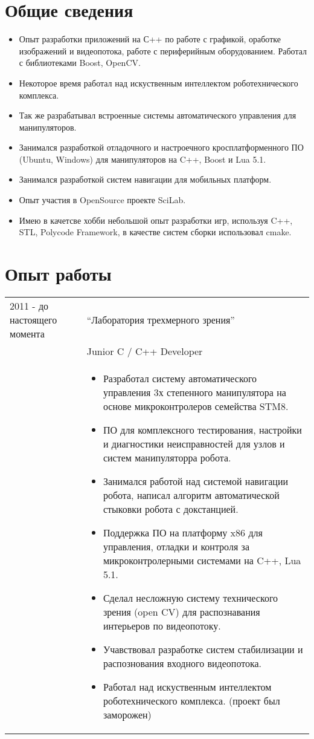 \documentclass[a4paper, 10pt]{article}
\begin{document}
\section{Общие сведения}
\begin{itemize}
    \item Опыт разработки приложений на С++ по работе с графикой, оработке
    изображений и видеопотока, работе с периферийным оборудованием. 
    Работал с библиотеками Boost, OpenCV. 
    \item Некоторое время работал над искуственным интеллектом роботехнического комплекса.
    \item Так же разрабатывал встроенные системы автоматического управления для
    манипуляторов. 
    \item Занимался разработкой отладочного и настроечного
    кросплатформенного ПО (Ubuntu, Windows) для манипуляторов на C++, Boost и Lua 5.1. 
    \item Занимался разработкой систем навигации для мобильных платформ.
    \item Опыт участия в OpenSource проекте SciLab.
    \item Имею в качетсве хобби небольшой опыт разработки игр, используя C++, STL,
    Polycode Framework, в качестве систем сборки использовал cmake.
\end{itemize}


\section{Опыт работы }
\begin{tabular}{p{25mm}|p{110mm}}
2011 - до настоящего момента
    & ``Лаборатория трехмерного зрения'' \\
    & Junior C / C++ Developer \\
    &   \begin{itemize}
        \item Разработал систему автоматического управления 
            3х степенного манипулятора на основе микроконтролеров семейства STM8.
        \item ПО для комплексного тестирования, настройки и диагностики
            неисправностей для узлов и систем манипуляторра робота.
        \item Занимался работой над системой навигации робота,
            написал алгоритм автоматической стыковки робота с докстанцией.
        \item Поддержка ПО на платформу x86 для управления, 
            отладки и контроля за микроконтролерными системами на C++, Lua 5.1.
        \item Сделал несложную систему технического зрения (open CV) 
            для распознавания интерьеров по видеопотоку.
        \item Учавствовал разработке систем стабилизации и
            распознования входного видеопотока.
        \item Работал над искуственным интеллектом роботехнического комплекса.
            (проект был заморожен) 
        \end{itemize}
    \\
\end{tabular}
\end{document}
